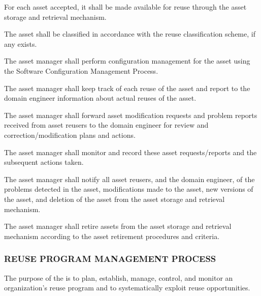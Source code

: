 \begin{adjustwidth}{2em}{0pt}
\begin{compactenum}
\begin{compactenum}
						\item For each asset accepted, it shall be made available for reuse through the asset storage and retrieval mechanism.

						\item The asset shall be classified in accordance with the reuse classification scheme, if any exists.

						\item The asset manager shall perform configuration management for the asset using the Software Configuration Management Process.

						\item The asset manager shall keep track of each reuse of the asset and report to the domain engineer information about actual reuses of the asset.

						\item The asset manager shall forward asset modification requests and problem reports received from asset reusers to the domain engineer for review and correction/modification plans and actions.

						\item The asset manager shall monitor and record these asset requests/reports and the subsequent actions taken.

						\item The asset manager shall notify all asset reusers, and the domain engineer, of the problems detected in the asset, modifications made to the asset, new versions of the asset, and deletion of the asset from the asset storage and retrieval mechanism.

						\item The asset manager shall retire assets from the asset storage and retrieval mechanism according to the asset retirement procedures and criteria.

					\end{compactenum}

				\end{compactenum}

			\end{adjustwidth}

		\newpage
		\subsubsection{REUSE PROGRAM MANAGEMENT PROCESS\label{proc:reuse_program_management_process}}

			\begin{adjustwidth}{2em}{0pt} 

				The purpose of the  is to plan, establish, manage, control, and monitor an organization's reuse program and to systematically exploit reuse opportunities.

			\end{adjustwidth}

